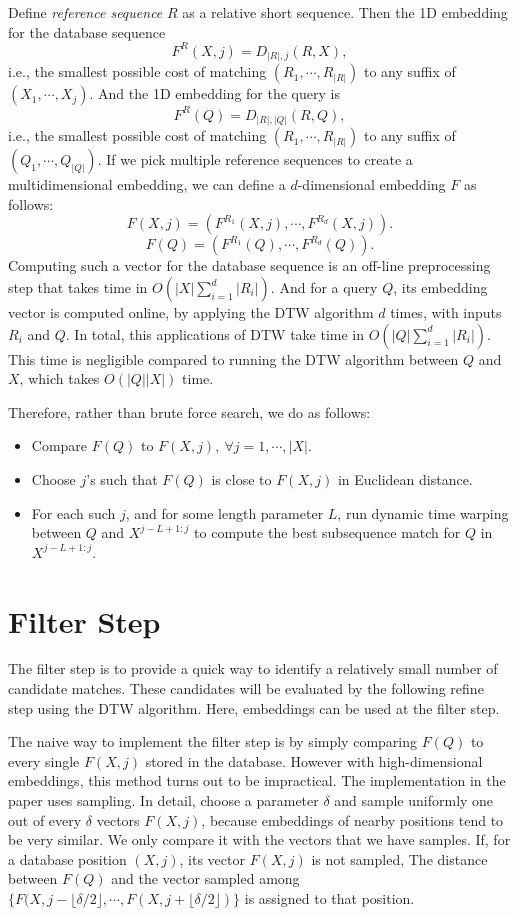 \documentclass{article}
\newenvironment{innerlist}[1][\enskip\textbullet]{
	\begin{itemize}[
			#1, leftmargin = 2em, parsep = 0pt, itemsep = 0pt, topsep = 0pt, partopsep = 0pt
			]
		}{\end{itemize}}
\begin{document}
Define \emph{reference sequence} $R$ as a relative short sequence. Then the 1D embedding for the database sequence $$F^R(X, j) = D_{|R|,j}(R, X),$$ i.e., the smallest possible cost of matching $(R_1, \cdots, R_{|R|})$ to any suffix of $(X_1, \cdots, X_j)$. And the 1D embedding for the query is $$F^R(Q) = D_{|R|,|Q|}(R, Q),$$ i.e., the smallest possible cost of matching $(R_1, \cdots, R_{|R|})$ to any suffix of $(Q_1, \cdots, Q_{|Q|})$. If we pick multiple reference sequences to create a multidimensional embedding, we can define a $d$-dimensional embedding $F$ as follows: 
$$F(X,j) = (F^{R_1}(X,j), \cdots, F^{R_d}(X,j)).$$
$$F(Q) = (F^{R_1}(Q), \cdots, F^{R_d}(Q)).$$
Computing such a vector for the database sequence is an off-line preprocessing step that takes time in $O(|X|\sum_{i=1}^d|R_i|)$. And for a query $Q$, its embedding vector is computed online, by applying the DTW algorithm $d$ times, with inputs $R_i$ and $Q$. In total, this applications of DTW take time in $O(|Q|\sum_{i=1}^d|R_i|)$. This time is negligible compared to running the DTW algorithm between $Q$ and $X$, which takes $O(|Q||X|)$ time. \par

Therefore, rather than brute force search, we do as follows:
\begin{innerlist}
\item Compare $F(Q)$ to $F(X,j),\ \forall j=1,\cdots,|X|$.
\item Choose $j$'s such that $F(Q)$ is close to $F(X,j)$ in Euclidean distance.
\item For each such $j$, and for some length parameter $L$, run dynamic time warping between $Q$ and $X^{j-L+1:j}$ to compute the best subsequence match for $Q$ in $X^{j-L+1:j}$.
\end{innerlist}

\section{Filter Step}
The filter step is to provide a quick way to identify a relatively small number of candidate matches. These candidates will be evaluated by the following refine step using the DTW algorithm. Here, embeddings can be used at the filter step. \par

The naive way to implement the filter step is by simply comparing $F(Q)$ to every single $F(X,j)$ stored in the database. However with high-dimensional embeddings, this method turns out to be impractical. The implementation in the paper uses sampling. In detail, choose a parameter $\delta$ and sample uniformly one out of every $\delta$ vectors $F(X,j)$, because embeddings of nearby positions tend to be very similar. We only compare it with the vectors that we have samples. If, for a database position $(X,j)$, its vector $F(X,j)$ is not sampled, The distance between $F(Q)$ and the vector sampled among $\{F(X,j-\lfloor\delta/2\rfloor,\cdots,F(X,j+\lfloor\delta/2\rfloor)\}$ is assigned to that position.
\end{document}

